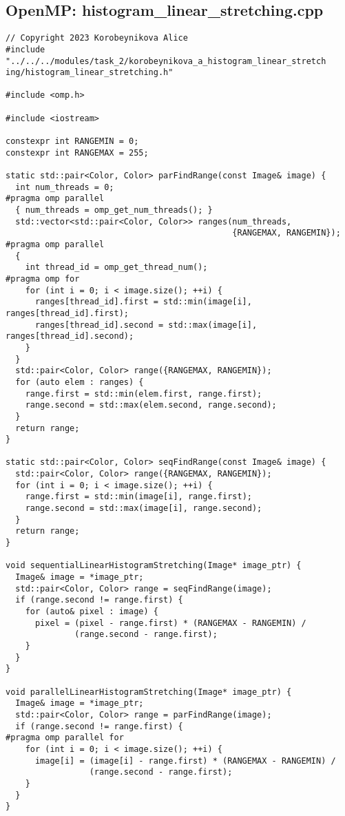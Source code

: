 \documentclass[14pt, russian]{extarticle}
\begin{document}
	\subsection{OpenMP: histogram\_linear\_stretching.cpp}
	\begin{lstlisting}
// Copyright 2023 Korobeynikova Alice
#include "../../../modules/task_2/korobeynikova_a_histogram_linear_stretch ing/histogram_linear_stretching.h"

#include <omp.h>

#include <iostream>

constexpr int RANGEMIN = 0;
constexpr int RANGEMAX = 255;

static std::pair<Color, Color> parFindRange(const Image& image) {
  int num_threads = 0;
#pragma omp parallel
  { num_threads = omp_get_num_threads(); }
  std::vector<std::pair<Color, Color>> ranges(num_threads,
                                              {RANGEMAX, RANGEMIN});
#pragma omp parallel
  {
    int thread_id = omp_get_thread_num();
#pragma omp for
    for (int i = 0; i < image.size(); ++i) {
      ranges[thread_id].first = std::min(image[i], ranges[thread_id].first);
      ranges[thread_id].second = std::max(image[i], ranges[thread_id].second);
    }
  }
  std::pair<Color, Color> range({RANGEMAX, RANGEMIN});
  for (auto elem : ranges) {
    range.first = std::min(elem.first, range.first);
    range.second = std::max(elem.second, range.second);
  }
  return range;
}

static std::pair<Color, Color> seqFindRange(const Image& image) {
  std::pair<Color, Color> range({RANGEMAX, RANGEMIN});
  for (int i = 0; i < image.size(); ++i) {
    range.first = std::min(image[i], range.first);
    range.second = std::max(image[i], range.second);
  }
  return range;
}

void sequentialLinearHistogramStretching(Image* image_ptr) {
  Image& image = *image_ptr;
  std::pair<Color, Color> range = seqFindRange(image);
  if (range.second != range.first) {
    for (auto& pixel : image) {
      pixel = (pixel - range.first) * (RANGEMAX - RANGEMIN) /
              (range.second - range.first);
    }
  }
}

void parallelLinearHistogramStretching(Image* image_ptr) {
  Image& image = *image_ptr;
  std::pair<Color, Color> range = parFindRange(image);
  if (range.second != range.first) {
#pragma omp parallel for
    for (int i = 0; i < image.size(); ++i) {
      image[i] = (image[i] - range.first) * (RANGEMAX - RANGEMIN) /
                 (range.second - range.first);
    }
  }
}
	\end{lstlisting}
	\newpage
	
\end{document}

